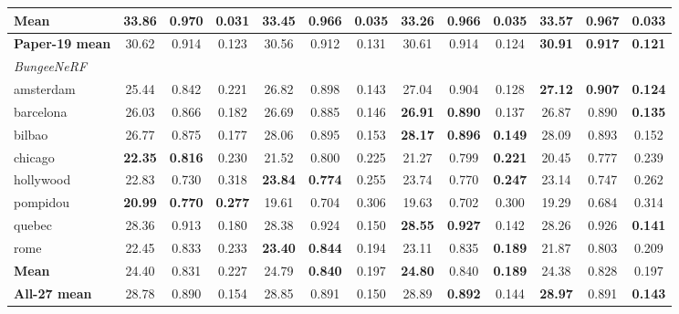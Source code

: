 \begin{table}[t]
{\begin{tabular}{lcccccccccccc}
\textbf{Mean} & \textbf{33.86} & \textbf{0.970} & \textbf{0.031} & 33.45 & 0.966 & 0.035 & 33.26 & 0.966 & 0.035 & 33.57 & 0.967 & 0.033 \\
\midrule
\textbf{Paper-19 mean} & 30.62 & 0.914 & 0.123 & 30.56 & 0.912 & 0.131 & 30.61 & 0.914 & 0.124 & \textbf{30.91} & \textbf{0.917} & \textbf{0.121} \\
\midrule
\multicolumn{13}{l}{\textit{BungeeNeRF}} \\
amsterdam & 25.44 & 0.842 & 0.221 & 26.82 & 0.898 & 0.143 & 27.04 & 0.904 & 0.128 & \textbf{27.12} & \textbf{0.907} & \textbf{0.124} \\
barcelona & 26.03 & 0.866 & 0.182 & 26.69 & 0.885 & 0.146 & \textbf{26.91} & \textbf{0.890} & 0.137 & 26.87 & 0.890 & \textbf{0.135} \\
bilbao & 26.77 & 0.875 & 0.177 & 28.06 & 0.895 & 0.153 & \textbf{28.17} & \textbf{0.896} & \textbf{0.149} & 28.09 & 0.893 & 0.152 \\
chicago & \textbf{22.35} & \textbf{0.816} & 0.230 & 21.52 & 0.800 & 0.225 & 21.27 & 0.799 & \textbf{0.221} & 20.45 & 0.777 & 0.239 \\
hollywood & 22.83 & 0.730 & 0.318 & \textbf{23.84} & \textbf{0.774} & 0.255 & 23.74 & 0.770 & \textbf{0.247} & 23.14 & 0.747 & 0.262 \\
pompidou & \textbf{20.99} & \textbf{0.770} & \textbf{0.277} & 19.61 & 0.704 & 0.306 & 19.63 & 0.702 & 0.300 & 19.29 & 0.684 & 0.314 \\
quebec & 28.36 & 0.913 & 0.180 & 28.38 & 0.924 & 0.150 & \textbf{28.55} & \textbf{0.927} & 0.142 & 28.26 & 0.926 & \textbf{0.141} \\
rome & 22.45 & 0.833 & 0.233 & \textbf{23.40} & \textbf{0.844} & 0.194 & 23.11 & 0.835 & \textbf{0.189} & 21.87 & 0.803 & 0.209 \\
\textbf{Mean} & 24.40 & 0.831 & 0.227 & 24.79 & \textbf{0.840} & 0.197 & \textbf{24.80} & 0.840 & \textbf{0.189} & 24.38 & 0.828 & 0.197 \\
\textbf{All-27 mean} & 28.78 & 0.890 & 0.154 & 28.85 & 0.891 & 0.150 & 28.89 & \textbf{0.892} & 0.144 & \textbf{28.97} & 0.891 & \textbf{0.143} \\
\bottomrule
\end{tabular}%
}
\end{table}
